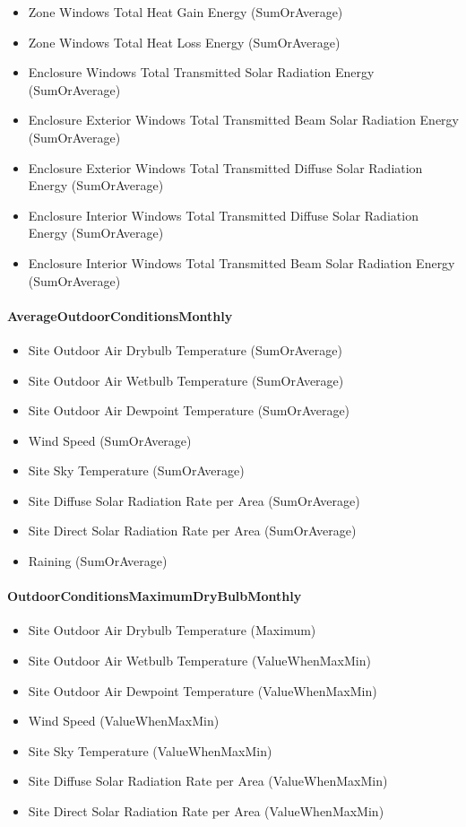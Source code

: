 \begin{itemize}
\item
  Zone Windows Total Heat Gain Energy (SumOrAverage)
\item
  Zone Windows Total Heat Loss Energy (SumOrAverage)
\item
  Enclosure Windows Total Transmitted Solar Radiation Energy (SumOrAverage)
\item
  Enclosure Exterior Windows Total Transmitted Beam Solar Radiation Energy (SumOrAverage)
\item
  Enclosure Exterior Windows Total Transmitted Diffuse Solar Radiation Energy (SumOrAverage)
\item
  Enclosure Interior Windows Total Transmitted Diffuse Solar Radiation Energy (SumOrAverage)
\item
  Enclosure Interior Windows Total Transmitted Beam Solar Radiation Energy (SumOrAverage)
\end{itemize}

\paragraph{AverageOutdoorConditionsMonthly}\label{averageoutdoorconditionsmonthly}

\begin{itemize}
\item
  Site Outdoor Air Drybulb Temperature (SumOrAverage)
\item
  Site Outdoor Air Wetbulb Temperature (SumOrAverage)
\item
  Site Outdoor Air Dewpoint Temperature (SumOrAverage)
\item
  Wind Speed (SumOrAverage)
\item
  Site Sky Temperature (SumOrAverage)
\item
  Site Diffuse Solar Radiation Rate per Area (SumOrAverage)
\item
  Site Direct Solar Radiation Rate per Area (SumOrAverage)
\item
  Raining (SumOrAverage)
\end{itemize}

\paragraph{OutdoorConditionsMaximumDryBulbMonthly}\label{outdoorconditionsmaximumdrybulbmonthly}

\begin{itemize}
\item
  Site Outdoor Air Drybulb Temperature (Maximum)
\item
  Site Outdoor Air Wetbulb Temperature (ValueWhenMaxMin)
\item
  Site Outdoor Air Dewpoint Temperature (ValueWhenMaxMin)
\item
  Wind Speed (ValueWhenMaxMin)
\item
  Site Sky Temperature (ValueWhenMaxMin)
\item
  Site Diffuse Solar Radiation Rate per Area (ValueWhenMaxMin)
\item
  Site Direct Solar Radiation Rate per Area (ValueWhenMaxMin)
\end{itemize}

